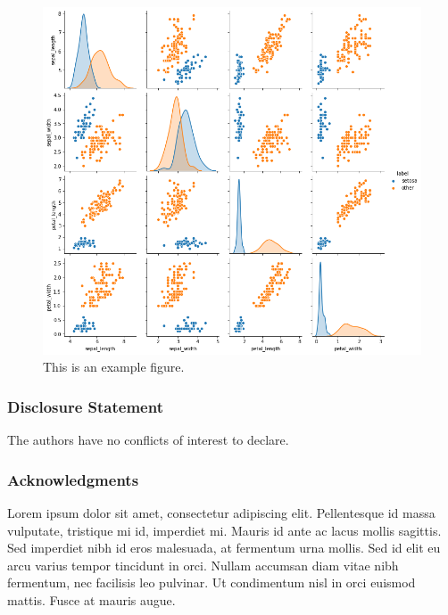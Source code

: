 \documentclass[
]{hdsr}
\begin{document}
\begin{figure}

{\centering \includegraphics{figs/iris_pairs.png}

}

\caption{\label{fig-my-label}This is an example figure.}

\end{figure}

\hypertarget{disclosure-statement}{%
\subsubsection*{Disclosure Statement}\label{disclosure-statement}}

The authors have no conflicts of interest to declare.

\hypertarget{acknowledgments}{%
\subsubsection*{Acknowledgments}\label{acknowledgments}}

Lorem ipsum dolor sit amet, consectetur adipiscing elit. Pellentesque id
massa vulputate, tristique mi id, imperdiet mi. Mauris id ante ac lacus
mollis sagittis. Sed imperdiet nibh id eros malesuada, at fermentum urna
mollis. Sed id elit eu arcu varius tempor tincidunt in orci. Nullam
accumsan diam vitae nibh fermentum, nec facilisis leo pulvinar. Ut
condimentum nisl in orci euismod mattis. Fusce at mauris augue.
\end{document}
